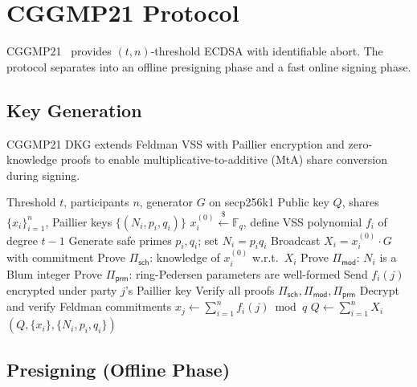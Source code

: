 \documentclass[11pt,twocolumn]{article}
\begin{document}
\section{CGGMP21 Protocol}
\label{sec:cggmp}

CGGMP21~\cite{canetti2021cggmp} provides $(t,n)$-threshold ECDSA with identifiable
abort. The protocol separates into an offline presigning phase and a fast online
signing phase.

\subsection{Key Generation}

CGGMP21 DKG extends Feldman VSS with Paillier encryption and zero-knowledge proofs to
enable multiplicative-to-additive (MtA) share conversion during signing.

\begin{algorithm}[H]
\caption{CGGMP21 Distributed Key Generation}
\label{alg:cggmp-dkg}
\begin{algorithmic}[1]
\Require Threshold $t$, participants $n$, generator $G$ on secp256k1
\Ensure Public key $Q$, shares $\{x_i\}_{i=1}^n$, Paillier keys $\{(N_i, p_i, q_i)\}$
  \State $x_i^{(0)} \xleftarrow{\$} \mathbb{F}_q$, define VSS polynomial $f_i$ of degree $t-1$
  \State Generate safe primes $p_i, q_i$; set $N_i = p_i q_i$
  \State Broadcast $X_i = x_i^{(0)} \cdot G$ with commitment
  \State Prove $\Pi_{\mathsf{sch}}$: knowledge of $x_i^{(0)}$ w.r.t.\ $X_i$
  \State Prove $\Pi_{\mathsf{mod}}$: $N_i$ is a Blum integer
  \State Prove $\Pi_{\mathsf{prm}}$: ring-Pedersen parameters are well-formed
  \State Send $f_i(j)$ encrypted under party $j$'s Paillier key
\EndFor
{}
  \State Verify all proofs $\Pi_{\mathsf{sch}}, \Pi_{\mathsf{mod}}, \Pi_{\mathsf{prm}}$
  \State Decrypt and verify Feldman commitments
  \State $x_j \gets \sum_{i=1}^n f_i(j) \bmod q$
\EndFor
\State $Q \gets \sum_{i=1}^n X_i$
\State \Return $(Q, \{x_i\}, \{N_i, p_i, q_i\})$
\end{algorithmic}
\end{algorithm}

\subsection{Presigning (Offline Phase)}
\end{document}
